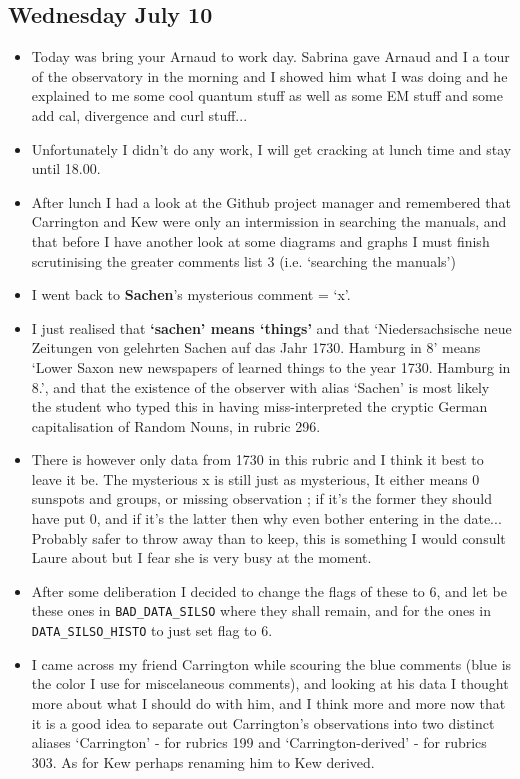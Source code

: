 \documentclass[12pt]{article}
\begin{document}
\subsection{Wednesday July 10}
\begin{itemize}
    \item Today was bring your Arnaud to work day. Sabrina gave Arnaud and I a tour of the observatory in the morning and I showed him what I was doing and he explained to me some cool quantum stuff as well as some EM stuff and some add cal, divergence and curl stuff... 
    \item Unfortunately I didn't do any work, I will get cracking at lunch time and stay until 18.00.
    \item After lunch I had a look at the Github project manager and remembered that Carrington and Kew were only an intermission in searching the manuals, and that before I have another look at some diagrams and graphs I must finish scrutinising the greater comments list 3 (i.e. `searching the manuals')
    \item I went back to \textbf{Sachen}'s mysterious comment = `x'.
    \item I just realised that  \textbf{`sachen' means `things'} and that `Niedersachsische neue Zeitungen von gelehrten Sachen auf das Jahr 1730. Hamburg in 8' means `Lower Saxon new newspapers of learned things to the year 1730. Hamburg in 8.', and that the existence of the observer with alias `Sachen' is most likely the student who typed this in having miss-interpreted the cryptic German capitalisation of Random Nouns, in rubric 296.
    \item There is however only data from 1730 in this rubric and I think it best to leave it be. The mysterious x is still just as mysterious, It either means 0 sunspots and groups, or missing observation ; if it's the former they should have put 0, and if it's the latter then why even bother entering in the date... Probably safer to throw away than to keep, this is something I would consult Laure about but I fear she is very busy at the moment.
    \item After some deliberation I decided to change the flags of these to 6, and let be these ones in \texttt{BAD\_DATA\_SILSO} where they shall remain, and for the ones in \texttt{DATA\_SILSO\_HISTO} to just set flag to 6.
    \item I came across my friend Carrington while scouring the blue comments (blue is the color I use for miscelaneous comments), and looking at his data I thought more about what I should do with him, and I think more and more now that it is a good idea to separate out Carrington's observations into two distinct aliases `Carrington' - for rubrics 199 and `Carrington-derived' - for rubrics 303. As for Kew perhaps renaming him to Kew derived.

\end{itemize}
\end{document}
